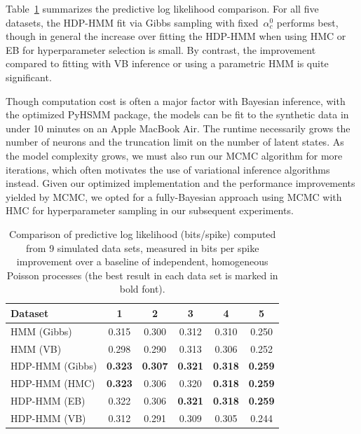 Table~\ref{tab:synth_pll} summarizes the predictive log likelihood
comparison.  For all five datasets, the HDP-HMM fit via Gibbs sampling
with fixed~$\alpha_c^0$ performs best, though in general the increase
over fitting the HDP-HMM when using HMC or EB for hyperparameter
selection is small. By contrast, the improvement compared to fitting
with VB inference or using a parametric HMM is quite significant.

Though computation cost is often a major factor with Bayesian
inference, with the optimized PyHSMM package, the models can be fit to
the synthetic data in under 10 minutes on an Apple MacBook Air. The
runtime necessarily grows the number of neurons and the truncation
limit on the number of latent states. As the model complexity grows,
we must also run our MCMC algorithm for more iterations, which often
motivates the use of variational inference algorithms instead. Given
our optimized implementation and the performance improvements yielded
by MCMC, we opted for a fully-Bayesian approach using MCMC with HMC
for hyperparameter sampling in our subsequent experiments.

\begin{table}
  \centering
  \caption[Comparison of predictive log likelihood on synthetic
    data]{Comparison of predictive log likelihood (bits/spike)
    computed from 9 simulated data sets, measured in bits per spike
    improvement over a baseline of independent, homogeneous Poisson
    processes (the best result in each data set is marked in bold
    font). }
  \begin{tabular}{l|ccccc}
    Dataset & 1 & 2 & 3 & 4 & 5 \\
    \hline
    HMM (Gibbs) & 0.315 & 0.300 & 0.312 & 0.310 & 0.250 \\
    HMM (VB)  & 0.298 & 0.290 & 0.313 & 0.306 & 0.252 \\ 
    HDP-HMM (Gibbs) & \bf{0.323} & \bf{0.307} & \bf{0.321} & \bf{0.318} & \bf{0.259} \\
    HDP-HMM (HMC) & \bf{0.323} & 0.306 & 0.320 & \bf{0.318} & \bf{0.259} \\
    HDP-HMM (EB)  & 0.322 & 0.306 & \bf{0.321} & \bf{0.318} & \bf{0.259} \\
    HDP-HMM (VB)  & 0.312 & 0.291 & 0.309 & 0.305 & 0.244 \\
    \hline
  \end{tabular}
  \label{tab:synth_pll}
\end{table}

